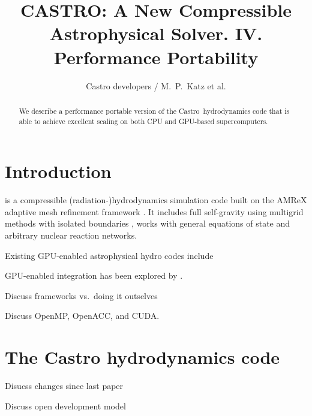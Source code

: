 \documentclass[twocolumn,times]{aastex62}
\newcommand{\castro}{{\sf Castro}}
\begin{document}
\title{CASTRO: A New Compressible Astrophysical Solver. IV. Performance Portability}

\shorttitle{}
\shortauthors{}

\author{Castro developers / M.~P.~Katz et al.}
\affil{}
\email{}


\begin{abstract}
We describe a performance portable version of the \castro\ hydrodynamics
code that is able to achieve excellent scaling on both CPU and GPU-based
supercomputers.
\end{abstract}


\section{Introduction}\label{Sec:Introduction}

is a compressible (radiation-)hydrodynamics simulation code built on
the AMReX adaptive mesh refinement framework \citep{castro,castro2,castro3}.  It 
includes full self-gravity using multigrid methods with isolated boundaries
\cite{katz:2016}, works with general equations of state \citep{zingalekatz}
and arbitrary nuclear reaction networks.

Existing GPU-enabled astrophysical hydro codes include
\citet{gamer,cholla,fargo3d,pekkila:2017,caplan:2018,racz:2018,liska:2018,goz:2018}

GPU-enabled integration has been explored by \citep{brock:2015}.

Discuss frameworks vs.\ doing it outselves

Discuss OpenMP, OpenACC, and CUDA.


\section{The Castro hydrodynamics code}

Disucss changes since last paper

Discuss open development model
\end{document}
